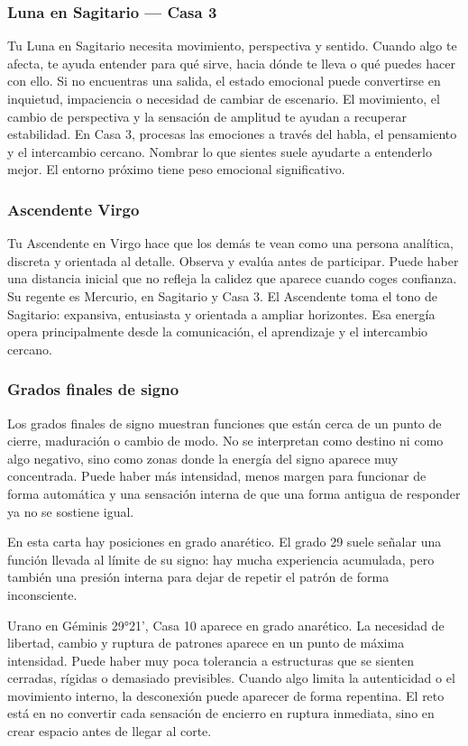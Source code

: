 \documentclass[11pt,a4paper]{article}\usepackage[utf8]{inputenc}
\begin{document}
\subsubsection*{Luna en Sagitario — Casa 3}
Tu Luna en Sagitario necesita movimiento, perspectiva y sentido. Cuando algo te afecta, te ayuda entender para qué sirve, hacia dónde te lleva o qué puedes hacer con ello. Si no encuentras una salida, el estado emocional puede convertirse en inquietud, impaciencia o necesidad de cambiar de escenario. El movimiento, el cambio de perspectiva y la sensación de amplitud te ayudan a recuperar estabilidad. En Casa 3, procesas las emociones a través del habla, el pensamiento y el intercambio cercano. Nombrar lo que sientes suele ayudarte a entenderlo mejor. El entorno próximo tiene peso emocional significativo.

\subsubsection*{Ascendente Virgo}
Tu Ascendente en Virgo hace que los demás te vean como una persona analítica, discreta y orientada al detalle. Observa y evalúa antes de participar. Puede haber una distancia inicial que no refleja la calidez que aparece cuando coges confianza. Su regente es Mercurio, en Sagitario y Casa 3. El Ascendente toma el tono de Sagitario: expansiva, entusiasta y orientada a ampliar horizontes. Esa energía opera principalmente desde la comunicación, el aprendizaje y el intercambio cercano.

\subsubsection*{Grados finales de signo}
Los grados finales de signo muestran funciones que están cerca de un punto de cierre, maduración o cambio de modo. No se interpretan como destino ni como algo negativo, sino como zonas donde la energía del signo aparece muy concentrada. Puede haber más intensidad, menos margen para funcionar de forma automática y una sensación interna de que una forma antigua de responder ya no se sostiene igual.

En esta carta hay posiciones en grado anarético. El grado 29 suele señalar una función llevada al límite de su signo: hay mucha experiencia acumulada, pero también una presión interna para dejar de repetir el patrón de forma inconsciente.

Urano en Géminis 29°21', Casa 10 aparece en grado anarético. La necesidad de libertad, cambio y ruptura de patrones aparece en un punto de máxima intensidad. Puede haber muy poca tolerancia a estructuras que se sienten cerradas, rígidas o demasiado previsibles. Cuando algo limita la autenticidad o el movimiento interno, la desconexión puede aparecer de forma repentina. El reto está en no convertir cada sensación de encierro en ruptura inmediata, sino en crear espacio antes de llegar al corte.
\end{document}
